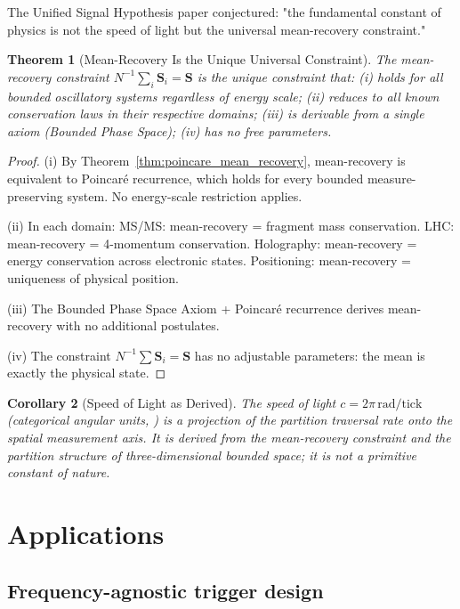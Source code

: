 \documentclass[twocolumn,10pt,a4paper]{article}
\theoremstyle{thmstyle}
\newtheorem{theorem}{Theorem}[section]
\newtheorem{corollary}[theorem]{Corollary}
\theoremstyle{definition}
\theoremstyle{remark}
\newcommand{\Sv}{\mathbf{S}}
\begin{document}
The Unified Signal Hypothesis paper conjectured: "the fundamental constant
of physics is not the speed of light but the universal mean-recovery
constraint."

\begin{theorem}[Mean-Recovery Is the Unique Universal Constraint]
\label{thm:fundamental}
The mean-recovery constraint $N^{-1}\sum_i \Sv_i = \Sv$ is the unique
constraint that:
(i) holds for all bounded oscillatory systems regardless of energy scale;
(ii) reduces to all known conservation laws in their respective domains;
(iii) is derivable from a single axiom (Bounded Phase Space);
(iv) has no free parameters.
\end{theorem}

\begin{proof}
(i) By Theorem~\ref{thm:poincare_mean_recovery}, mean-recovery is equivalent
to Poincar\'e recurrence, which holds for every bounded measure-preserving
system.  No energy-scale restriction applies.

(ii) In each domain:
MS/MS: mean-recovery = fragment mass conservation.
LHC: mean-recovery = 4-momentum conservation.
Holography: mean-recovery = energy conservation across electronic states.
Positioning: mean-recovery = uniqueness of physical position.

(iii) The Bounded Phase Space Axiom + Poincar\'e recurrence derives
mean-recovery with no additional postulates.

(iv) The constraint $N^{-1}\sum \Sv_i = \Sv$ has no adjustable
parameters: the mean is exactly the physical state.
\end{proof}

\begin{corollary}[Speed of Light as Derived]
The speed of light $c = 2\pi\,\text{rad/tick}$ (categorical angular units,
\citealt{companion:math}) is a projection of the partition traversal rate
onto the spatial measurement axis.  It is derived from the mean-recovery
constraint and the partition structure of three-dimensional bounded space;
it is not a primitive constant of nature.
\end{corollary}

\section{Applications}
\label{sec:applications}

\subsection{Frequency-agnostic trigger design}
\end{document}
